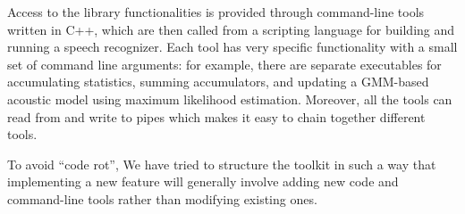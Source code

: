 \documentclass[10pt,conference,letterpaper]{IEEEtran}
\begin{document}
Access to the library functionalities is provided through command-line tools 
written in C++, which are then called from a scripting language for building 
and running a speech recognizer. 
Each tool has very specific functionality with a small set of command line 
arguments: for example, there are separate executables for accumulating 
statistics, summing accumulators, and updating a GMM-based acoustic model using 
maximum likelihood estimation. 
Moreover, all the tools can read from and write to pipes which makes it 
easy to chain together different tools.

To avoid ``code rot'', We have tried to structure the toolkit in such a way that
implementing a new feature will generally involve adding new code and
command-line tools rather than modifying existing ones.




\end{document}
